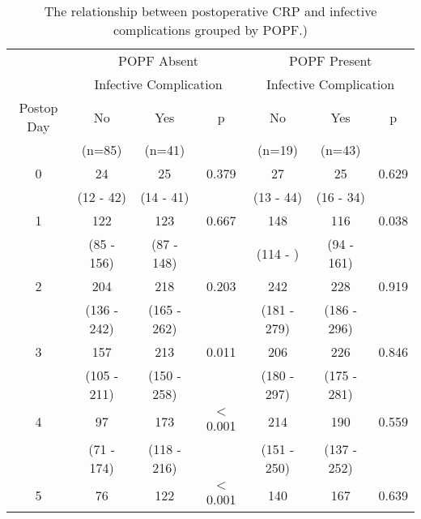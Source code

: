 \begin{table}[h]
	\centering
	\caption{The relationship between postoperative CRP and infective complications grouped by POPF.)}
	\label{table:crp_comp_vs_infections_popf_y1n0}
	\begin{tabular}{| c | c c c | c c c |}
		\hline
		           &       \multicolumn{3}{c|}{POPF Absent}       &      \multicolumn{3}{c|}{POPF Present}       \\
		           & \multicolumn{3}{c|}{Infective Complication} & \multicolumn{3}{c|}{Infective Complication} \\
		Postop Day & No          & Yes         & p                & No          & Yes         & p                \\
		           & (n=85)      & (n=41)      &                  & (n=19)      & (n=43)      &  \\ \hline
		0          & 24          & 25          & 0.379            & 27          & 25          & 0.629            \\
		           & (12 - 42)   & (14 - 41)   &                  & (13 - 44)   & (16 - 34)   &  \\
		1          & 122         & 123         & 0.667            & 148         & 116         & 0.038            \\
		           & (85 - 156)  & (87 - 148)  &                  & (114 - )    & (94 - 161)  &  \\
		2          & 204         & 218         & 0.203            & 242         & 228         & 0.919            \\
		           & (136 - 242) & (165 - 262) &                  & (181 - 279) & (186 - 296) &  \\
		3          & 157         & 213         & 0.011            & 206         & 226         & 0.846            \\
		           & (105 - 211) & (150 - 258) &                  & (180 - 297) & (175 - 281) &  \\
		4          & 97          & 173         & $<$0.001         & 214         & 190         & 0.559            \\
		           & (71 - 174)  & (118 - 216) &                  & (151 - 250) & (137 - 252) &  \\
		5          & 76          & 122         & $<$0.001         & 140         & 167         & 0.639            \\

\end{tabular}
\end{table}
